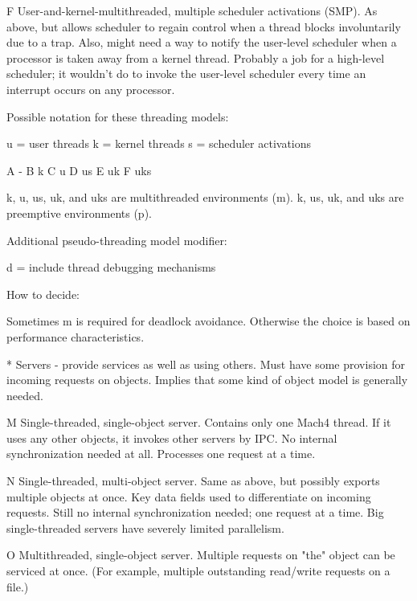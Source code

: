 {        F User-and-kernel-multithreaded, multiple scheduler activations (SMP).
          As above, but allows scheduler to regain control
          when a thread blocks involuntarily due to a trap.
          Also, might need a way to notify the user-level scheduler
          when a processor is taken away from a kernel thread.
          Probably a job for a high-level scheduler;
          it wouldn't do to invoke the user-level scheduler
          every time an interrupt occurs on any processor.

        Possible notation for these threading models:

                u = user threads
                k = kernel threads
                s = scheduler  activations

                A -
                B k
                C u
                D us
                E uk
                F uks

                k, u, us, uk, and uks are multithreaded environments (m).
                k, us, uk, and uks are preemptive environments (p).

        Additional pseudo-threading model modifier:

                d = include thread debugging mechanisms

        How to decide:

                Sometimes m is required for deadlock avoidance.
                Otherwise the choice is based on performance characteristics.

* Servers - provide services as well as using others.
  Must have some provision for incoming requests on objects.
  Implies that some kind of object model is generally needed.

        M Single-threaded, single-object server.
          Contains only one Mach4 thread.
          If it uses any other objects, it invokes other servers by IPC\@.
          No internal synchronization needed at all.
          Processes one request at a time.

        N Single-threaded, multi-object server. 
          Same as above, but possibly exports multiple objects at once.
          Key data fields used to differentiate on incoming requests.
          Still no internal synchronization needed; one request at a time.
          Big single-threaded servers have severely limited parallelism.

        O Multithreaded, single-object server.
          Multiple requests on "the" object can be serviced at once.
          (For example, multiple outstanding read/write requests on a file.)

}
